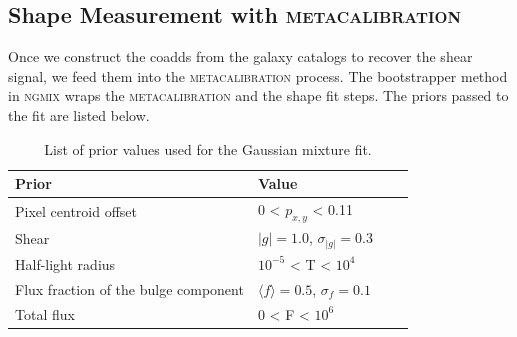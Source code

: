 \documentclass[fleqn,usenatbib]{mnras}
\begin{document}
\par

\subsection{Shape Measurement with \textsc{metacalibration}}
\label{subsec:mcal}
Once we construct the coadds from the galaxy catalogs to recover the shear signal, we feed them into the \textsc{metacalibration} process. The bootstrapper method in \textsc{ngmix} wraps the \textsc{metacalibration} and the shape fit steps. The priors passed to the fit are listed below. 

\begin{table}
    \centering
    \begin{tabular}{|p{3cm}||p{3cm}|p{3cm}|p{3cm}|}
    \hline
    Prior & Value \\
    \hline
    Pixel centroid offset & 0 < $p_{x,y}$ < 0.11\\
    Shear & $|g|=1.0$, $\sigma_{|g|} = 0.3$\\
    Half-light radius & $10^{-5}$ < T < $10^{4}$\\
    Flux fraction of the bulge component & $\langle f\rangle = 0.5$, $\sigma_{f} = 0.1$\\
    Total flux & $0$ < F < $10^{6}$\\
    \hline
    \end{tabular}
    \caption{List of prior values used for the Gaussian mixture fit.}
    \label{tab:priors}
\end{table}
\end{document}
